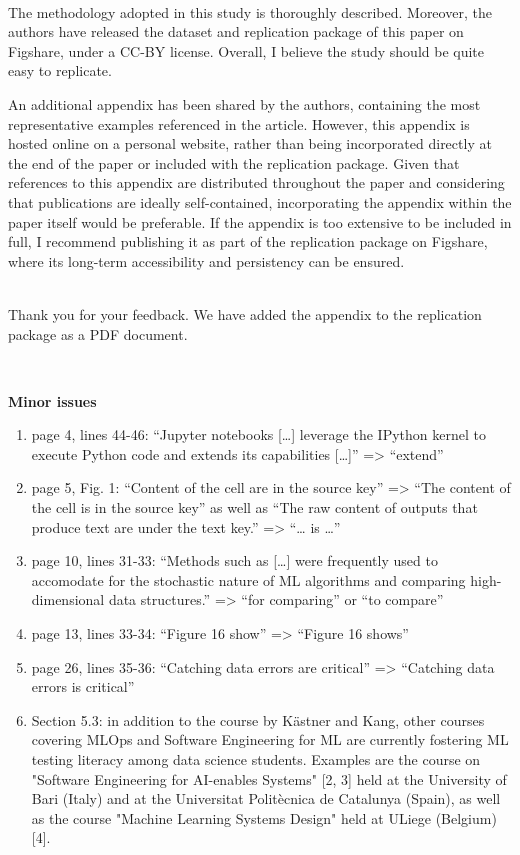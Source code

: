 \documentclass[11pt,fleqn]{article}
\newcommand{\eline}{\vspace*{.75\baselineskip}}
\newcommand{\Referee}[1]{\eline \noindent {\bf Reviewer comment #1:} \\}
\newcommand{\Us}{\eline \noindent {\bf Response:}\\}
\newenvironment{revcomment}[1][]
{\Referee{#1}\begin{rcomment}}
{\end{rcomment}}
\begin{document}
\begin{revcomment}[1.10]

  The methodology adopted in this study is thoroughly described. Moreover, the authors have released the dataset and replication package of this paper on Figshare, under a CC-BY license. Overall, I believe the study should be quite easy to replicate.

  An additional appendix has been shared by the authors, containing the most representative examples referenced in the article. However, this appendix is hosted online on a personal website, rather than being incorporated directly at the end of the paper or included with the replication package. Given that references to this appendix are distributed throughout the paper and considering that publications are ideally self-contained, incorporating the appendix within the paper itself would be preferable. If the appendix is too extensive to be included in full, I recommend publishing it as part of the replication package on Figshare, where its long-term accessibility and persistency can be ensured.
\end{revcomment}

\Us Thank you for your feedback. We have added the appendix to the replication package as a PDF document.

\begin{revcomment}[1.11]

  \textbf{Minor issues}
  \begin{enumerate}
  \item page 4, lines 44-46: ``Jupyter notebooks […] leverage the IPython kernel to execute Python code and extends its capabilities […]'' => ``extend''
  \item page 5, Fig. 1: ``Content of the cell are in the source key'' => ``The content of the cell is in the source key'' as well as ``The raw content of outputs that produce text are under the text key.'' => ``… is …''
  \item page 10, lines 31-33: ``Methods such as […] were frequently used to accomodate for the stochastic nature of ML algorithms and comparing high-dimensional data structures.'' => ``for comparing'' or ``to compare''
  \item page 13, lines 33-34: ``Figure 16 show'' => ``Figure 16 shows''
  \item page 26, lines 35-36: ``Catching data errors are critical'' => ``Catching data errors is critical''
  \item Section 5.3: in addition to the course by Kästner and Kang, other courses covering MLOps and Software Engineering for ML are currently fostering ML testing literacy among data science students. Examples are the course on "Software Engineering for AI-enables Systems" [2, 3] held at the University of Bari (Italy) and at the Universitat Politècnica de Catalunya (Spain), as well as the course "Machine Learning Systems Design" held at ULiege (Belgium) [4].
  \end{enumerate}
\end{revcomment}
\end{document}

